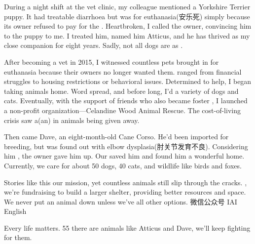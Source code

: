 \documentclass{英语试卷}
\begin{document}
\par During a night shift at the vet clinic, my colleague mentioned a Yorkshire Terrier puppy. It had treatable diarrhoea but was  for euthanasia(安乐死) simply because its owner refused to pay for the . Heartbroken, I called the owner, convincing him to  the puppy to me. I treated him, named him Atticus, and he has thrived as my close companion for eight years. Sadly, not all dogs are as .\par
\par After becoming a vet in 2015, I witnessed countless pets brought in for euthanasia because their owners no longer wanted them.  ranged from financial struggles to housing restrictions or behavioral issues. Determined to help, I began taking  animals home. Word spread, and before long, I'd  a variety of dogs and cats. Eventually, with the support of friends who also became foster , I launched a non-profit organization—Celandine Wood Animal Rescue. The cost-of-living crisis saw a(an)  in animals being given away.\par
\par Then came Dave, an eight-month-old Cane Corso. He’d been imported for breeding, but was found out with elbow dysplasia(肘关节发育不良). Considering him , the owner gave him up. Our  saved him and found him a wonderful home. Currently, we care for about 50 dogs, 40 cats, and wildlife like birds and foxes.\par
\par Stories like this  our mission, yet countless animals still slip through the cracks. , we're fundraising to build a larger shelter, providing better resources and space. We never put an animal down unless we've  all other options. 微信公众号 IAI English\par
\par Every life matters. 55 there are animals like Atticus and Dave, we'll keep fighting for them.\par
{}
\end{document}
